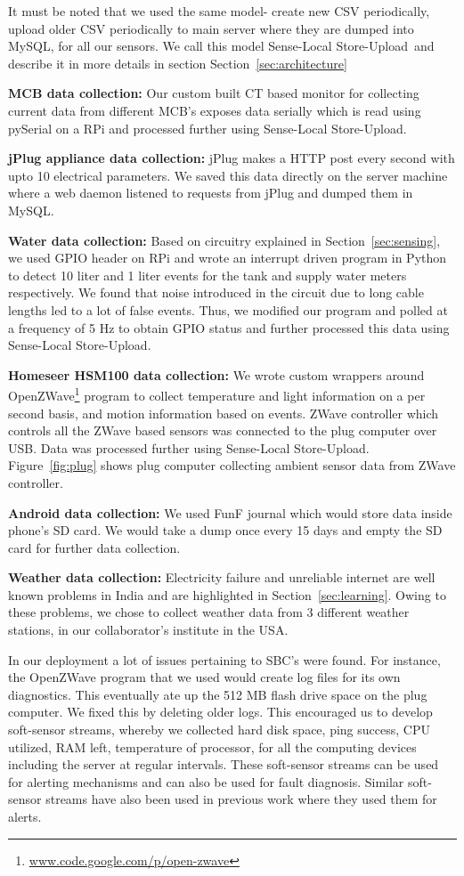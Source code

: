 \documentclass[10pt]{sensys-proc}
\newcommand{\figref}[1]{Figure~\ref{#1}}
\newcommand{\secref}[1]{Section~\ref{#1}}
\newcommand{\paradigm}{Sense-Local Store-Upload}
\newcommand{\paradigms}{Sense-Local Store-Upload~}
\begin{document}
It must be noted that we used the same model- create new CSV periodically, upload older CSV periodically to main server where they are dumped into MySQL, for all our sensors. We call this model \paradigms and describe it in more details in section \secref{sec:architecture}

\noindent \textbf{MCB data collection:} Our custom built CT based monitor for collecting current data from different MCB's exposes data serially which is read using pySerial on a RPi and processed further using \paradigm.

\noindent \textbf{jPlug appliance data collection:} jPlug makes a HTTP post every second with upto 10 electrical parameters. We saved this data directly on the server machine where a web daemon listened to requests from jPlug and dumped them in MySQL.

\noindent \textbf{Water data collection:} Based on circuitry explained in \secref{sec:sensing}, we used GPIO header on RPi and wrote an interrupt driven program in Python to detect 10 liter and 1 liter events for the tank and supply water meters respectively. We found that noise introduced in the circuit due to long cable lengths led to a lot of false events. Thus, we modified our program and polled at a frequency of 5 Hz to obtain GPIO status and further processed this data using \paradigm.	

\noindent \textbf{Homeseer HSM100 data collection:} We wrote custom wrappers around OpenZWave\footnote{\url{www.code.google.com/p/open-zwave}} program to collect temperature and light information on a per second basis, and motion information based on events. ZWave controller which controls all the ZWave based sensors was connected to the plug computer over USB. Data was processed further using \paradigm. \figref{fig:plug} shows plug computer collecting ambient sensor data from ZWave controller.

\noindent \textbf{Android data collection:} We used FunF journal which would store data inside phone's SD card. We would take a dump once every 15 days and empty the SD card for further data collection.

\noindent \textbf{Weather data collection:} Electricity failure  and unreliable internet are well known problems in India and are highlighted in \secref{sec:learning}. Owing to these problems, we chose to collect weather data from 3 different weather stations, in our collaborator's institute in the USA.

In our deployment a lot of issues pertaining to SBC's were found. For instance, the OpenZWave program that we used would create log files for its own diagnostics. This eventually ate up the 512 MB flash drive space on the plug computer. We fixed this by deleting older logs. This encouraged us to develop soft-sensor streams, whereby we collected hard disk space, ping success, CPU utilized, RAM left, temperature of processor, for all the computing devices including the server at regular intervals. These soft-sensor streams can be used for alerting mechanisms and can also be used for fault diagnosis. Similar soft-sensor streams have also been used in previous work\cite{hitchhiker_residential} where they used them for alerts.
\end{document}
